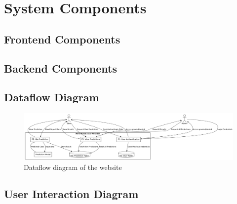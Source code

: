 \section{System Components}
\subsection{Frontend Components}
\subsection{Backend Components}
\subsection{Dataflow Diagram}
\begin{figure}[htbp]
  \begin{center}
    \includegraphics[width=\textwidth]{figures/dataflow.png}
  \end{center}
  \caption{Dataflow diagram of the website}\label{fig:dataflow}
\end{figure}

\subsection{User Interaction Diagram}

